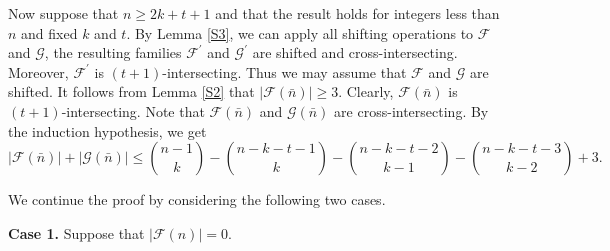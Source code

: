 \documentclass[11pt]{article}
\numberwithin{equation}{section}
\begin{document}
Now suppose that $n \geq 2 k+t+1$ and that the result holds for integers less than $n$ and fixed $k$ and $t$. By Lemma \ref{S3},  we can apply all shifting operations to $\mathcal{F}$ and $\mathcal{G}$, the resulting families $\mathcal{F}^{\prime}$ and $\mathcal{G}^{\prime}$ are shifted and cross-intersecting. Moreover,   $\mathcal{F}^{\prime}$ is $(t+1)$-intersecting.
Thus we may assume that $\mathcal{F}$ and $\mathcal{G}$ are shifted.
It follows from Lemma \ref{S2} that $|\mathcal{F}(\bar{n})| \geq 3$. Clearly, $\mathcal{F}(\bar{n})$ is $(t+1)$-intersecting. Note that $\mathcal{F}(\bar{n})$ and
$\mathcal{G}(\bar{n})$ are cross-intersecting.  By the  induction hypothesis, we get
$$
|\mathcal{F}(\bar{n})|+|\mathcal{G}(\bar{n})| \leq\binom{n-1}{k}-\binom{n-k-t-1}{k}-\binom{n-k-t-2}{k-1}-\binom{n-k-t-3}{k-2}+3.
$$

We  continue the proof by considering the following two cases.

{\bf Case 1.} Suppose that $|\mathcal{F}(n)|=0$.
\end{document}
